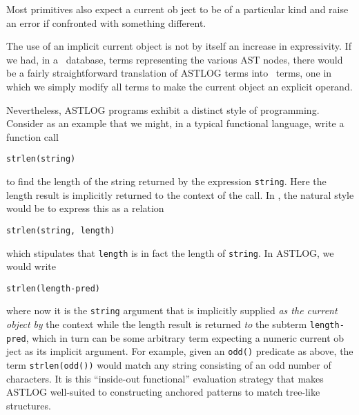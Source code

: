 Most primitives also expect a current ob ject to be of a particular kind and
raise an error if confronted with something different.

The use of an implicit current object is not by itself an increase in
expressivity. If we had, in a \prolog\ database, terms representing the various
AST nodes, there would be a fairly straightforward translation of ASTLOG terms
into \prolog\ terms, one in which we simply modify all terms to make the current
object an explicit operand.

Nevertheless, ASTLOG programs exhibit a distinct style of programming. Consider
as an example that we might, in a typical functional language, write a function
call
\begin{verbatim}
strlen(string)
\end{verbatim}
to find the length of the string returned by the expression \verb|string|. Here
the length result is implicitly returned to the context of the call. In \prolog,
the natural style would be to express this as a relation
\begin{verbatim}
strlen(string, length)
\end{verbatim}
which stipulates that \verb|length| is in fact the length of \verb|string|. In
ASTLOG, we would write
\begin{verbatim}
strlen(length-pred)
\end{verbatim}
where now it is the \verb|string| argument that is implicitly supplied \emph{as
the current object} \textit{by} the context while the length result is returned
\textit{to} the subterm \verb|length-pred|, which in turn can be some arbitrary
term expecting a numeric current ob ject as its implicit argument. For example,
given an \verb|odd()| predicate as above, the term \verb|strlen(odd())| would
match any string consisting of an odd number of characters. It is this
``inside-out functional'' evaluation strategy that makes ASTLOG well-suited to
constructing anchored patterns to match tree-like structures.

\label{crewfig2}

